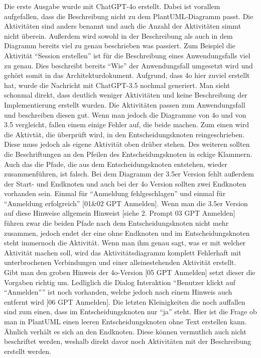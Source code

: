 Die erste Ausgabe wurde mit ChatGPT-4o erstellt. Dabei ist vorallem aufgefallen, dass die Beschreibung nicht zu dem PlantUML-Diagramm passt. Die Aktivitäten
sind anders benannt und auch die Anzahl der Aktivitäten simmt nicht überein. Außerdem wird sowohl in der Beschreibung als auch in dem Diagramm bereits 
viel zu genau beschrieben was passiert. Zum Beispiel die Aktivität ``Session erstellen'' ist für die Beschreibung eines Anwendungsfalls viel zu genau.
Dies beschreibt bereits ``Wie'' der Anwendungsfall umgesetzt wird und gehört somit in das Architekturdokument. Aufgrund, dass 4o hier zuviel erstellt hat, 
wurde die Nachricht mit ChatGPT-3.5 nochmal generiert. Man sieht schonmal direkt, dass deutlich weniger Aktivitäten und keine Beschreibung der Implementierung 
erstellt wurden. Die Aktivitäten passen zum Anwendungsfall und beschreiben diesen gut. Wenn man jedoch die Diagramme von 4o und von 3.5 vergleicht,
fallen einem einige Fehler auf, die beide machen. Zum einen wird die Aktivtät, die überprüft wird, in den Entscheidungsknoten reingeschrieben. Diese muss jedoch als eigene 
Aktivität oben drüber stehen. Des weiteren sollten die Beschriftungen an den Pfeilen des Entscheidungsknoten in eckige Klammern. Auch das die Pfade, die 
aus dem Entscheidungsknoten entstehen, wieder zusammenführen, ist falsch. Bei dem Diagramm der 3.5er Version fehlt außerdem der Start- und Endknoten und auch 
bei der 4o Version sollten zwei Endknoten vorhanden sein. Einmal für ``Anmeldung fehlgeschlagen'' und einmal für ``Anmeldung erfolgreich'' [01\&02 GPT Anmelden].
Wenn man die 3.5er Version auf diese Hinweise allgemein Hinweist [siehe 2. Prompt 03 GPT Anmelden] führen zwar die beiden Pfade nach dem Entscheidungsknoten nicht mehr 
zusammen, jedoch endet der eine ohne Endknoten und im Entscheidungsknoten steht immernoch die Aktivität. Wenn man ihm genau sagt, was er mit welcher Aktivität
machen soll, wird das Aktivitätsdiagramm komplett Fehlerhaft mit unterbrochenen Verbindungen und einer alleinestehenden Aktivität erstellt.\\
Gibt man den groben Hinweis der 4o-Version [05 GPT Anmelden] setzt dieser die Vorgaben richtig um. Ledliglich die Dialog Interaktion ``Benutzer klickt auf ``Anmelden''''
ist noch vorhanden, welche jedoch nach einem Hinweis auch entfernt wird [06 GPT Anmelden]. Die letzten Kleinigkeiten die noch auffallen sind zum einen, dass
im Entscheidungsknoten nur ``ja'' steht. Hier ist die Frage ob man in PlantUML einen leeren Entscheidungsknoten ohne Text erstellen kann. Ähnlich 
verhält es sich an den Endknoten. Diese können vermutlich auch nicht beschriftet werden, weshalb direkt davor noch Aktivitäten mit der Beschreibung erstellt
werden.\\

